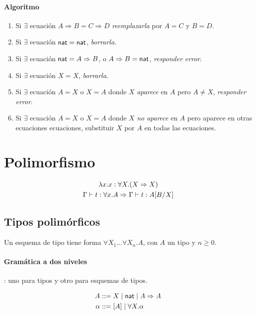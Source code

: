 \documentclass[twoside,a4paper,12pt]{article}
\theoremstyle{definition}
\theoremstyle{remark}
\begin{document}
\paragraph{Algoritmo}
\begin{enumerate}
  \item Si $\exists$ ecuación $A\Rightarrow B=C\Rightarrow D$ \emph{reemplazarla}
    por $A=C$ y $B=D$.
  \item Si $\exists$ ecuación $\mathsf{nat}=\mathsf{nat}$, \emph{borrarla}.
  \item Si $\exists$ ecuación $\mathsf{nat}=A\Rightarrow B$, o $A\Rightarrow B=\mathsf{nat}$, \emph{responder error}.
  \item Si $\exists$ ecuación $X=X$, \emph{borrarla}.
  \item Si $\exists$ ecuación $A=X$ o $X=A$ donde $X$ \emph{aparece} en $A$ pero $A\neq X$, \emph{responder error}.
  \item Si $\exists$ ecuación $A=X$ o $X=A$ donde $X$ \emph{no aparece} en $A$ pero
    aparece en otras ecuaciones ecuaciones, substituir $X$ por $A$ en todas las
    ecuaciones.
\end{enumerate}


\newpage
\section*{Polimorfismo}

\begin{gather*}
  \lambda {x}{.}{x} : \forall X.(X\Rightarrow X) \\
  \Gamma \vdash t : \forall x.A \Rightarrow \Gamma \vdash t: A[B/X]
\end{gather*}

\subsection*{Tipos polimórficos}

\begin{definicion}{6.2}
  Un esquema de tipo tiene forma $\forall X_1\dots\forall X_n.A$,
  con $A$ un tipo y $n\geq 0$.
\end{definicion}

\paragraph*{Gramática a dos niveles}: uno para tipos y otro para
esquemas de tipos.

\begin{align*}
  A & ::= X \mid \mathsf{nat} \mid A\Rightarrow A\\
  \alpha & ::= [A]\mid\forall X.\alpha
\end{align*}
\end{document}
